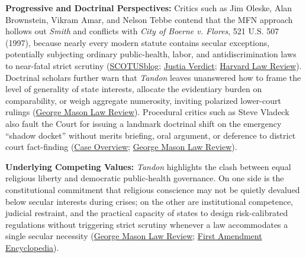 \documentclass[12pt]{article}
\begin{document}
\textbf{Progressive and Doctrinal Perspectives:} Critics such as Jim Oleske, Alan Brownstein, Vikram Amar, and Nelson Tebbe contend that the MFN approach hollows out \textit{Smith} and conflicts with \textit{City of Boerne v. Flores}, 521 U.S. 507 (1997), because nearly every modern statute contains secular exceptions, potentially subjecting ordinary public-health, labor, and antidiscrimination laws to near-fatal strict scrutiny (\href{https://www.scotusblog.com/2021/04/tandon-steals-fultons-thunder-the-most-important-free-exercise-decision-since-1990/}{SCOTUSblog}; \href{https://verdict.justia.com/2021/04/30/exploring-the-meaning-of-and-problems-with-the-supreme-courts-apparent-adoption-of-a-most-favored-nation-approach-to-protecting-religious-liberty-under-the-free-exercise-c}{Justia Verdict}; \href{https://harvardlawreview.org/print/vol-137/a-law-unto-himselfemp-div-v-smith-494-u-s-872-879-1990-quoting-reynolds-v-united-states-98-u-s-145-167-1879-free-exercise-unequal-value-and-the-future-of-public/}{Harvard Law Review}). Doctrinal scholars further warn that \textit{Tandon} leaves unanswered how to frame the level of generality of state interests, allocate the evidentiary burden on comparability, or weigh aggregate numerosity, inviting polarized lower-court rulings (\href{https://lawreview.gmu.edu/print__issues/religious-and-secular-comparators/}{George Mason Law Review}). Procedural critics such as Steve Vladeck also fault the Court for issuing a landmark doctrinal shift on the emergency ``shadow docket'' without merits briefing, oral argument, or deference to district court fact-finding (\href{https://en.wikipedia.org/wiki/Tandon_v._Newsom}{Case Overview}; \href{https://lawreview.gmu.edu/print__issues/religious-and-secular-comparators/}{George Mason Law Review}).

\textbf{Underlying Competing Values:} \textit{Tandon} highlights the clash between equal religious liberty and democratic public-health governance. On one side is the constitutional commitment that religious conscience may not be quietly devalued below secular interests during crises; on the other are institutional competence, judicial restraint, and the practical capacity of states to design risk-calibrated regulations without triggering strict scrutiny whenever a law accommodates a single secular necessity (\href{https://lawreview.gmu.edu/print__issues/religious-and-secular-comparators/}{George Mason Law Review}; \href{https://firstamendment.mtsu.edu/article/tandon-v-newsom/}{First Amendment Encyclopedia}).
\end{document}
